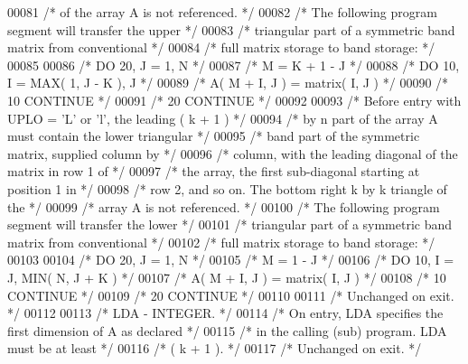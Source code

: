 \begin{DoxyCode}
00081 \textcolor{comment}{/*           of the array A is not referenced. */}
00082 \textcolor{comment}{/*           The following program segment will transfer the upper */}
00083 \textcolor{comment}{/*           triangular part of a symmetric band matrix from conventional */}
00084 \textcolor{comment}{/*           full matrix storage to band storage: */}
00085 
00086 \textcolor{comment}{/*                 DO 20, J = 1, N */}
00087 \textcolor{comment}{/*                    M = K + 1 - J */}
00088 \textcolor{comment}{/*                    DO 10, I = MAX( 1, J - K ), J */}
00089 \textcolor{comment}{/*                       A( M + I, J ) = matrix( I, J ) */}
00090 \textcolor{comment}{/*              10    CONTINUE */}
00091 \textcolor{comment}{/*              20 CONTINUE */}
00092 
00093 \textcolor{comment}{/*           Before entry with UPLO = 'L' or 'l', the leading ( k + 1 ) */}
00094 \textcolor{comment}{/*           by n part of the array A must contain the lower triangular */}
00095 \textcolor{comment}{/*           band part of the symmetric matrix, supplied column by */}
00096 \textcolor{comment}{/*           column, with the leading diagonal of the matrix in row 1 of */}
00097 \textcolor{comment}{/*           the array, the first sub-diagonal starting at position 1 in */}
00098 \textcolor{comment}{/*           row 2, and so on. The bottom right k by k triangle of the */}
00099 \textcolor{comment}{/*           array A is not referenced. */}
00100 \textcolor{comment}{/*           The following program segment will transfer the lower */}
00101 \textcolor{comment}{/*           triangular part of a symmetric band matrix from conventional */}
00102 \textcolor{comment}{/*           full matrix storage to band storage: */}
00103 
00104 \textcolor{comment}{/*                 DO 20, J = 1, N */}
00105 \textcolor{comment}{/*                    M = 1 - J */}
00106 \textcolor{comment}{/*                    DO 10, I = J, MIN( N, J + K ) */}
00107 \textcolor{comment}{/*                       A( M + I, J ) = matrix( I, J ) */}
00108 \textcolor{comment}{/*              10    CONTINUE */}
00109 \textcolor{comment}{/*              20 CONTINUE */}
00110 
00111 \textcolor{comment}{/*           Unchanged on exit. */}
00112 
00113 \textcolor{comment}{/*  LDA    - INTEGER. */}
00114 \textcolor{comment}{/*           On entry, LDA specifies the first dimension of A as declared */}
00115 \textcolor{comment}{/*           in the calling (sub) program. LDA must be at least */}
00116 \textcolor{comment}{/*           ( k + 1 ). */}
00117 \textcolor{comment}{/*           Unchanged on exit. */}

\end{DoxyCode}
